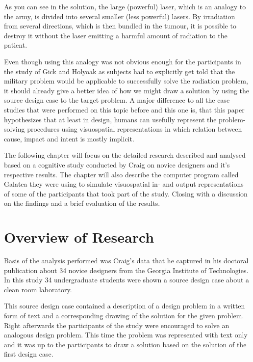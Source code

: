 \documentclass[12pt]{article}
\begin{document}
\newpage
As you can see in the solution, the large (powerful) laser, which is an analogy to the army, is divided into several smaller (less powerful) lasers. By irradiation from several directions, which is then bundled in the tumour, it is possible to destroy it without the laser emitting a harmful amount of radiation to the patient.
 
Even though using this analogy was not obvious enough for the participants in the study of Gick and Holyoak as subjects had to explicitly get told that the military problem would be applicable to successfully solve the radiation problem, it should already give a better idea of how we might draw a solution by using the source design case to the target problem. A major difference to all the case studies that were performed on this topic before and this one is, that this paper hypothesizes that at least in design, humans can usefully represent the problem-solving procedures using visuospatial representations in which relation between cause, impact and intent is mostly implicit. 

The following chapter will focus on the detailed research described and analysed based on a cognitive study conducted by Craig \cite{craig2001perceptual} on novice designers and it's respective results. The chapter will also describe the computer program called Galatea they were using to simulate visuospatial in- and output representations of some of the participants that took part of the study. Closing with a discussion on the findings and a brief evaluation of the results. 
\section{Overview of Research} %
Basis of the analysis performed was Craig's \cite{craig2001perceptual} %
data that he captured in his doctoral publication about 34 novice designers from the Georgia Institute of Technologies. In this study 34 undergraduate students were shown a source design case about a clean room laboratory. 

This source design case contained a description of a design problem in a written form of text and a corresponding drawing of the solution for the given problem. Right afterwards the participants of the study were encouraged to solve an analogous design problem. This time the problem was represented with text only and it was up to the participants to draw a solution based on the solution of the first design case. %
\end{document}
